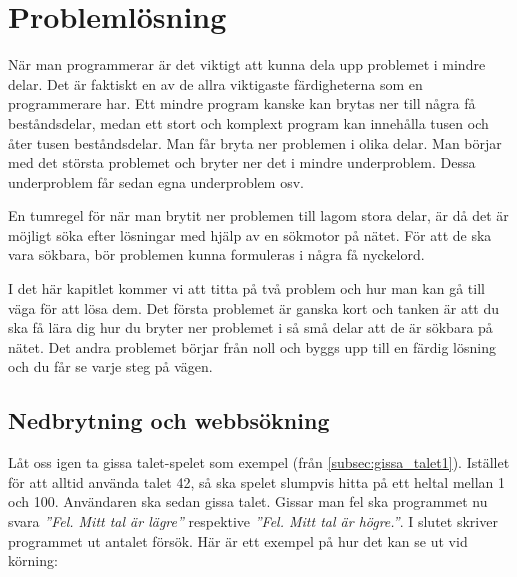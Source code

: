 %
%
\chapter{Problemlösning}\label{ch:problemlosning}
När man programmerar är det viktigt att kunna dela upp problemet i mindre delar. Det är faktiskt en av de allra viktigaste färdigheterna som en programmerare har. Ett mindre program kanske kan brytas ner till några få beståndsdelar, medan ett stort och komplext program kan innehålla tusen och åter tusen beståndsdelar. Man får bryta ner problemen i olika delar. Man börjar med det största problemet och bryter ner det i mindre underproblem. Dessa underproblem får sedan egna underproblem osv.

En tumregel för när man brytit ner problemen till lagom stora delar, är då det är möjligt söka efter lösningar med hjälp av en sökmotor på nätet. För att de ska vara sökbara, bör problemen kunna formuleras i några få nyckelord.

I det här kapitlet kommer vi att titta på två problem och hur man kan gå till väga för att lösa dem. Det första problemet är ganska kort och tanken är att du ska få lära dig hur du bryter ner problemet i så små delar att de är sökbara på nätet. Det andra problemet börjar från noll och byggs upp till en färdig lösning och du får se varje steg på vägen.


\section{Nedbrytning och webbsökning}
Låt oss igen ta gissa talet-spelet som exempel (från \autoref{subsec:gissa_talet1}). Istället för att alltid använda talet 42, så ska spelet slumpvis hitta på ett heltal mellan 1 och 100. Användaren ska sedan gissa talet. Gissar man fel ska programmet nu svara \emph{''Fel. Mitt tal är lägre''} respektive \emph{''Fel. Mitt tal är högre.''}. I slutet skriver programmet ut antalet försök.
\newpage
Här är ett exempel på hur det kan se ut vid körning:


